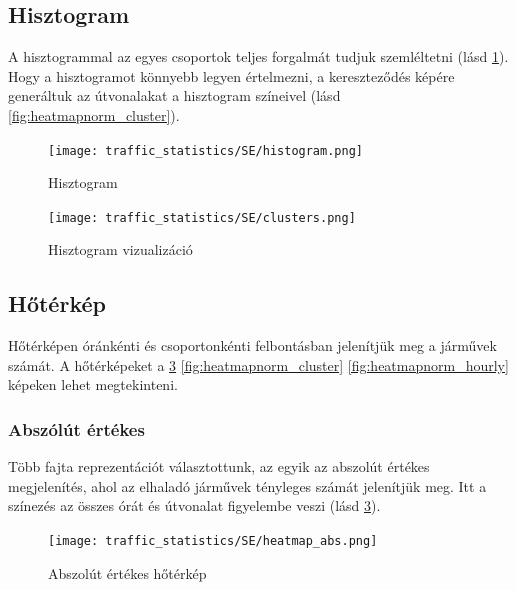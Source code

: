 \documentclass[12pt,a4paper]{article}
\begin{document}
\subsection{Hisztogram}
A hisztogrammal az egyes csoportok teljes forgalmát tudjuk szemléltetni (lásd \ref{fig:histogram}). Hogy a hisztogramot könnyebb legyen értelmezni, a kereszteződés képére generáltuk az útvonalakat a hisztogram színeivel (lásd \ref{fig:heatmapnorm_cluster}).
\begin{figure}[H]
    \centering
    \texttt{[image: traffic\_statistics/SE/histogram.png]}
    \caption{Hisztogram}
    \label{fig:histogram}
\end{figure}
\begin{figure}[H]
    \centering
    \texttt{[image: traffic\_statistics/SE/clusters.png]}
    \caption{Hisztogram vizualizáció}
    \label{fig:histvisualisation}
\end{figure}
\subsection{Hőtérkép}
Hőtérképen óránkénti és csoportonkénti felbontásban jelenítjük meg a járművek számát. A hőtérképeket a \ref{fig:heatmap} \ref{fig:heatmapnorm_cluster} \ref{fig:heatmapnorm_hourly} képeken lehet megtekinteni.
\subsubsection*{Abszólút értékes}
Több fajta reprezentációt választottunk, az egyik az abszolút értékes megjelenítés, ahol az elhaladó járművek tényleges számát jelenítjük meg. Itt a színezés az összes órát és útvonalat figyelembe veszi (lásd \ref{fig:heatmap}).
\begin{figure}[H]
    \centering
    \texttt{[image: traffic\_statistics/SE/heatmap\_abs.png]}
    \caption{Abszolút értékes hőtérkép}
    \label{fig:heatmap}
\end{figure}
\end{document}
